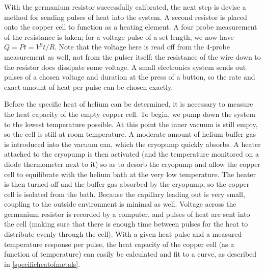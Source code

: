 With the germanium resistor successfully calibrated, the next step is devise a method for sending pulses of heat into the system. A second resistor is placed onto the copper cell to function as a heating element. A four probe measurement of the resistance is taken; for a voltage pulse of a set length, we now have $Q = P t = V^{2} t / R$. Note that the voltage here is read off from the 4-probe measurement as well, not from the pulser itself: the resistance of the wire down to the resistor does dissipate some voltage. A small electronics system sends out pulses of a chosen voltage and duration at the press of a button, so the rate and exact amount of heat per pulse can be chosen exactly.

Before the specific heat of helium can be determined, it is necessary to measure the heat capacity of the empty copper cell. To begin, we pump down the system to the lowest temperature possible. At this point the inner vacuum is still empty, so the cell is still at room temperature. A moderate amount of helium buffer gas is introduced into the vacuum can, which the cryopump quickly absorbs. A heater attached to the cryopump is then activated (and the temperature monitored on a diode thermometer next to it) so as to desorb the cryopump and allow the copper cell to equilibrate with the helium bath at the very low temperature. The heater is then turned off and the buffer gas absorbed by the cryopump, so the copper cell is isolated from the bath. Because the capillary leading out is very small, coupling to the outside environment is minimal as well. Voltage across the germanium resistor is recorded by a computer, and pulses of heat are sent into the cell (making sure that there is enough time between pulses for the heat to distribute evenly through the cell). With a given heat pulse and a measured temperature response per pulse, the heat capacity of the copper cell (as a function of temperature) can easily be calculated and fit to a curve, as described in \ref{specificheatofmetals}.

